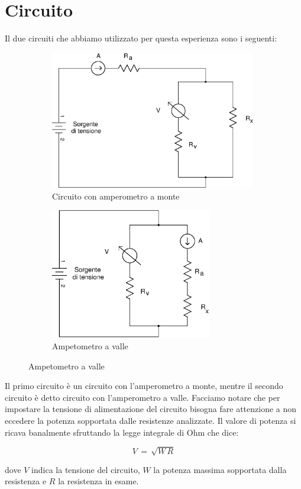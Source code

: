 \section*{Circuito}

Il due circuiti che abbiamo utilizzato per questa esperienza sono i seguenti:

\begin{figure}[h]
  \centering
  \begin{subfigure}[b]{0.50\textwidth}
    \includegraphics[width=9cm]{monte.eps}
    \caption{Circuito con amperometro a monte}
    \label{fig:monte}
  \end{subfigure}
  \qquad
  \begin{subfigure}[b]{0.40\textwidth}
    \includegraphics[width=7cm]{valle.eps}
    \caption{Ampetometro a valle}
    \label{fig:valle}
  \end{subfigure}
\end{figure}

Il primo circuito è un circuito con l'amperometro a monte, mentre il secondo circuito è detto circuito con l'amperometro a valle.
Facciamo notare che per impostare la tensione di alimentazione del circuito bisogna fare attenzione a non eccedere la potenza sopportata dalle resistenze analizzate. Il valore di potenza si ricava banalmente sfruttando la legge integrale di Ohm che dice:

\begin{equation}
	V \,=\, \sqrt{W\,R}
\end{equation}

dove $V$ indica la tensione del circuito, $W$ la potenza massima sopportata dalla resistenza e $R$ la resistenza in esame.





